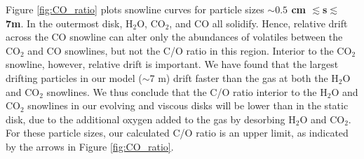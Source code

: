 \documentclass[apj]{emulateapj}
\begin{document}
Figure \ref{fig:CO_ratio} plots snowline curves for particle sizes \textbf{$\sim0.5$ cm $\lesssim $s$ \lesssim$ 7m}.  In the outermost disk, H$_2$O, CO$_2$, and CO all solidify.  Hence, relative drift across the CO snowline can alter only the abundances of volatiles between the CO$_2$ and CO snowlines, but not the C/O ratio in this region.  Interior to the CO$_2$ snowline, however, relative drift is important. 
We have found that the largest drifting particles in our model ($\sim$7 m) drift faster than the gas at both the H$_2$O and CO$_2$ snowlines. We thus conclude that the C/O ratio interior to the H$_2$O and CO$_2$ snowlines in our evolving and viscous disks will be lower than in the static disk, due to the additional oxygen added to the gas by desorbing H$_2$O and CO$_2$.  For these particle sizes, our calculated C/O ratio is an upper limit,  as indicated by the arrows in Figure \ref{fig:CO_ratio}.




\end{document}

